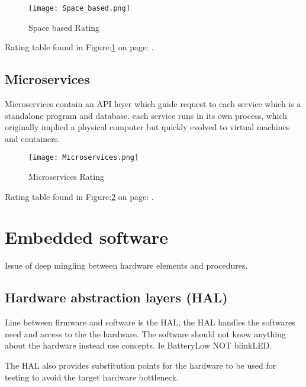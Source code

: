 \documentclass[11pt]{scrartcl} %
\begin{document}
\begin{figure}[h] %
	\centering
	\texttt{[image: Space\_based.png]} %
	\caption{Space based Rating}
  \label{Space_based}
\end{figure}

Rating table found in Figure:\ref{Space_based} on page: \pageref{Space_based}.

\subsection{Microservices}

Microservices contain an API layer which guide request to each service which is a 
standalone program and database.
each service runs in its own process, 
which originally implied a physical computer but quickly evolved to virtual machines and containers.\\

\begin{figure}[h] %
	\centering
	\texttt{[image: Microservices.png]} %
	\caption{Microservices Rating}
  \label{Microservices}
\end{figure}

Rating table found in Figure:\ref{Microservices} on page: \pageref{Microservices}.

\section{Embedded software}

Issue of deep mingling between hardware elements and procedures.\\

\subsection{Hardware abstraction layers (HAL)}

Line between firmware and software is the HAL, the HAL handles the softwares need and access to the
the hardware. The software should not know anything about the hardware instead use concepts. Ie
BatteryLow NOT blinkLED.

The HAL also provides substitution points for the hardware to be used for testing to avoid the
target hardware bottleneck.
\end{document}
